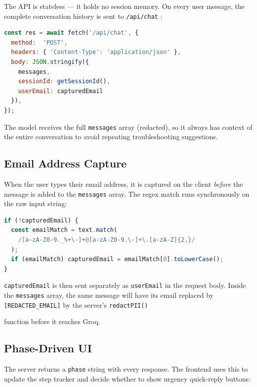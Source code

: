\documentclass[12pt, a4paper]{article}
\newcommand{\inlinecode}[1]{%
  \colorbox{inlinecode!20}{\texttt{\small #1}}%
}
\begin{document}
The API is stateless --- it holds no session memory. On every user message, the complete
conversation history is sent to \inlinecode{/api/chat}:

\begin{lstlisting}[language=JavaScript, caption={Request to /api/chat with full history}]
const res = await fetch('/api/chat', {
  method:  'POST',
  headers: { 'Content-Type': 'application/json' },
  body: JSON.stringify({
    messages,
    sessionId: getSessionId(),
    userEmail: capturedEmail
  }),
});
\end{lstlisting}

The model receives the full \inlinecode{messages} array (redacted), so it always has
context of the entire conversation to avoid repeating troubleshooting suggestions.

\subsection{Email Address Capture}
\label{sec:emailcapture}

When the user types their email address, it is captured on the client \emph{before} the
message is added to the \inlinecode{messages} array. The regex match runs synchronously
on the raw input string:

\begin{lstlisting}[language=JavaScript, caption={Client-side email capture}]
if (!capturedEmail) {
  const emailMatch = text.match(
    /[a-zA-Z0-9._%+\-]+@[a-zA-Z0-9.\-]+\.[a-zA-Z]{2,}/
  );
  if (emailMatch) capturedEmail = emailMatch[0].toLowerCase();
}
\end{lstlisting}

\inlinecode{capturedEmail} is then sent separately as \inlinecode{userEmail} in the
request body. Inside the \inlinecode{messages} array, the same message will have its
email replaced by \texttt{[REDACTED\_EMAIL]} by the server's \inlinecode{redactPII()}
function before it reaches Groq.

\subsection{Phase-Driven UI}

The server returns a \inlinecode{phase} string with every response. The frontend uses
this to update the step tracker and decide whether to show urgency quick-reply buttons:
\end{document}
